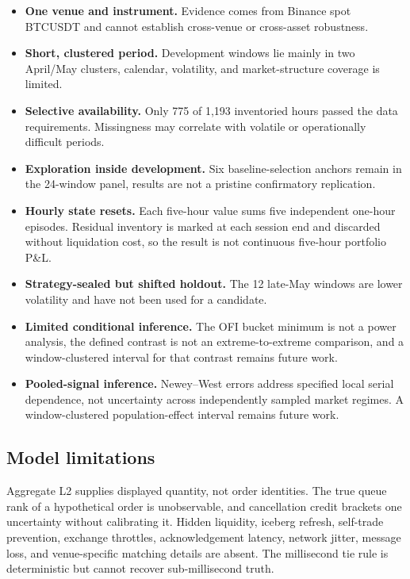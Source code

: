 \begin{itemize}
  \item \textbf{One venue and instrument.} Evidence comes from Binance spot
        BTCUSDT and cannot establish cross-venue or cross-asset robustness.
  \item \textbf{Short, clustered period.} Development windows lie mainly in
        two April/May clusters, calendar, volatility, and market-structure
        coverage is limited.
  \item \textbf{Selective availability.} Only 775 of 1,193 inventoried hours
        passed the data requirements. Missingness may correlate with volatile
        or operationally difficult periods.
  \item \textbf{Exploration inside development.} Six baseline-selection
        anchors remain in the 24-window panel, results are not a pristine
        confirmatory replication.
  \item \textbf{Hourly state resets.} Each five-hour value sums five independent
        one-hour episodes. Residual inventory is marked at each session end and
        discarded without liquidation cost, so the result is not continuous
        five-hour portfolio P\&L.
  \item \textbf{Strategy-sealed but shifted holdout.} The 12 late-May windows are lower
        volatility and have not been used for a candidate.
  \item \textbf{Limited conditional inference.} The OFI bucket minimum is not
        a power analysis, the defined contrast is not an extreme-to-extreme
        comparison, and a window-clustered interval for that contrast remains
        future work.
  \item \textbf{Pooled-signal inference.} Newey--West errors address specified
        local serial dependence, not uncertainty across independently sampled
        market regimes. A window-clustered population-effect interval remains
        future work.
\end{itemize}

\subsection{Model limitations}

Aggregate L2 supplies displayed quantity, not order identities. The true queue
rank of a hypothetical order is unobservable, and cancellation credit brackets
one uncertainty without calibrating it. Hidden liquidity, iceberg refresh,
self-trade prevention, exchange throttles, acknowledgement latency, network
jitter, message loss, and venue-specific matching details are absent. The
millisecond tie rule is deterministic but cannot recover sub-millisecond truth.

